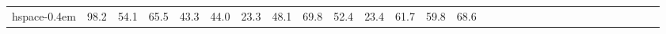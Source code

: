 \documentclass{article}
\begin{document}
\begin{table*}[]
\begin{tabular}{cc|cccccccccccccccccccccccccccc}
hspace{-0.4em} & \hspace{-0.9em}98.2\hspace{-0.4em} & \hspace{-0.9em}54.1\hspace{-0.4em} & \hspace{-0.9em}65.5\hspace{-0.4em} & \hspace{-0.9em}43.3\hspace{-0.4em} & \hspace{-0.9em}44.0\hspace{-0.4em} & \hspace{-0.9em}23.3\hspace{-0.4em} & \hspace{-0.9em}48.1\hspace{-0.4em} & \hspace{-0.9em}69.8\hspace{-0.4em} & \hspace{-0.9em}52.4\hspace{-0.4em} & \hspace{-0.9em}23.4\hspace{-0.4em} & \hspace{-0.9em}61.7\hspace{-0.4em} & \hspace{-0.9em}59.8\hspace{-0.4em} & \hspace{-0.9em}68.6\hspace{-0.4em} 
        \\

\end{tabular}
\end{table*}
\end{document}
